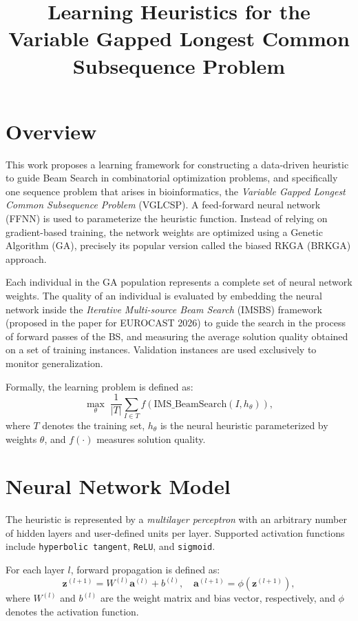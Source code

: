 \documentclass[11pt,a4paper]{article}
\title{Learning Heuristics for the Variable Gapped Longest Common Subsequence Problem}
\author{}
\date{}
\begin{document}
\maketitle

\section{Overview}

This work proposes a learning framework for constructing a data-driven heuristic to guide Beam Search in combinatorial optimization problems, and specifically one sequence problem that arises in bioinformatics, the \textit{Variable Gapped Longest Common Subsequence Problem} (VGLCSP). A feed-forward neural network (FFNN) is used to parameterize the heuristic function. Instead of relying on gradient-based training, the network weights are optimized using a Genetic Algorithm (GA), precisely its popular version  called the  biased RKGA (BRKGA) approach.  

Each individual in the GA population represents a complete set of neural network weights. The quality of an individual is evaluated by embedding the neural network inside the \textit{Iterative Multi-source Beam Search} (IMSBS) framework (proposed in the paper for EUROCAST 2026) to guide the search in the process of  forward passes of the BS,  
and measuring the average solution quality obtained on a set of training instances. Validation instances are used exclusively to monitor generalization.

Formally, the learning problem is defined as:
\[
\max_{\theta} \; \frac{1}{|T|} \sum_{I \in T} f(\text{IMS\_BeamSearch}(I, h_\theta)),
\]
where $T$ denotes the training set, $h_\theta$ is the neural heuristic parameterized by weights $\theta$, and $f(\cdot)$ measures solution quality.

\section{Neural Network Model}

The heuristic is represented by a \textit{multilayer perceptron} with an arbitrary number of hidden layers and user-defined units per layer. Supported activation functions include \texttt{hyperbolic tangent}, \texttt{ReLU}, and \texttt{sigmoid}.

For each layer $l$, forward propagation is defined as:
\[
\mathbf{z}^{(l+1)} = W^{(l)} \mathbf{a}^{(l)} + b^{(l)}, \quad
\mathbf{a}^{(l+1)} = \phi(\mathbf{z}^{(l+1)}),
\]
where $W^{(l)}$ and $b^{(l)}$ are the weight matrix and bias vector, respectively, and $\phi$ denotes the activation function.
\end{document}
